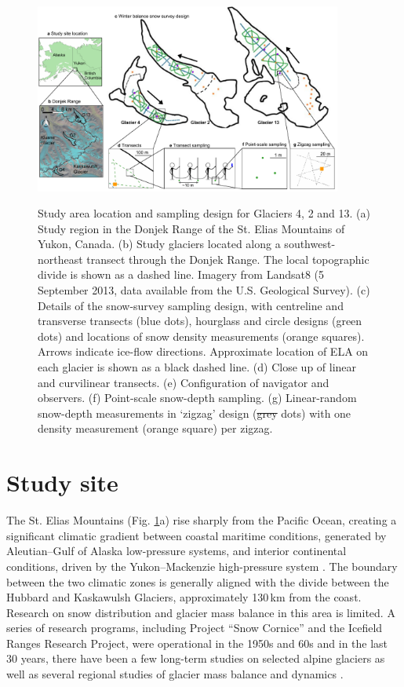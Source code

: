 \documentclass[review,oneside, letterpaper]{igs} %
\providecommand{\DIFadd}[1]{{\protect\color{blue}\uwave{#1}}} %
\providecommand{\DIFdel}[1]{{\protect\color{red}\sout{#1}}}                      %
\providecommand{\DIFaddFL}[1]{\DIFadd{#1}} %
\providecommand{\DIFdelFL}[1]{\DIFdel{#1}} %
\providecommand{\DIFaddbeginFL}{} %
\providecommand{\DIFaddendFL}{} %
\providecommand{\DIFdelbeginFL}{} %
\providecommand{\DIFdelendFL}{} %
\newcommand{\DIFscaledelfig}{0.5}
\newlength{\DIFdelgraphicswidth} %
\newlength{\DIFdelgraphicsheight} %
\newcommand{\DIFaddincludegraphics}[2][]{{\color{blue}\fbox{\DIFOincludegraphics[#1]{#2}}}} %
\newcommand{\DIFdelincludegraphics}[2][]{%
\sbox{\DIFdelgraphicsbox}{\DIFOincludegraphics[#1]{#2}}%
\settoboxwidth{\DIFdelgraphicswidth}{\DIFdelgraphicsbox} %
\settoboxtotalheight{\DIFdelgraphicsheight}{\DIFdelgraphicsbox} %
\scalebox{\DIFscaledelfig}{%
\parbox[b]{\DIFdelgraphicswidth}{\usebox{\DIFdelgraphicsbox}\\[-\baselineskip] \rule{\DIFdelgraphicswidth}{0em}}\llap{\resizebox{\DIFdelgraphicswidth}{\DIFdelgraphicsheight}{%
\setlength{\unitlength}{\DIFdelgraphicswidth}%
\begin{picture}(1,1)%
\thicklines\linethickness{2pt} %
{\color[rgb]{1,0,0}\put(0,0){\framebox(1,1){}}}%
{\color[rgb]{1,0,0}\put(0,0){\line( 1,1){1}}}%
{\color[rgb]{1,0,0}\put(0,1){\line(1,-1){1}}}%
\end{picture}%
}\hspace*{3pt}}} %
} %
\DeclareRobustCommand{\DIFaddbeginFL}{\DIFOaddbeginFL \let\includegraphics\DIFaddincludegraphics} %
\DeclareRobustCommand{\DIFaddendFL}{\DIFOaddendFL \let\includegraphics\DIFOincludegraphics} %
\DeclareRobustCommand{\DIFdelbeginFL}{\DIFOdelbeginFL \let\includegraphics\DIFdelincludegraphics} %
\DeclareRobustCommand{\DIFdelendFL}{\DIFOaddendFL \let\includegraphics\DIFOincludegraphics} %
\begin{document}
\begin{figure}
	\centering
	\includegraphics[width =0.9\textwidth]{Sampling.pdf}\\
	\caption{Study area location and sampling design for Glaciers 4, 2 and 13. (a) Study region in the Donjek Range of the St. Elias Mountains of Yukon, Canada. (b) Study glaciers located along a southwest-northeast transect through the Donjek Range. The local topographic divide is shown as a dashed line. Imagery from Landsat8 (5 September 2013, data available from the U.S. Geological Survey). (c) Details of the snow-survey sampling design, with centreline and transverse transects (blue dots), hourglass and circle designs (green dots) and locations of snow density measurements (orange squares). Arrows indicate ice-flow directions. Approximate location of ELA on each glacier is shown as a black dashed line. (d) Close up of linear and curvilinear transects. (e) Configuration of navigator and observers. (f) Point-scale snow-depth sampling. (g) Linear-random snow-depth measurements in `zigzag' design (\DIFdelbeginFL \DIFdelFL{grey }\DIFdelendFL \DIFaddbeginFL \DIFaddFL{purple }\DIFaddendFL dots) with one density measurement (orange square) per zigzag.}
	\label{fig:Sampling}
\end{figure}

\section{Study site}

The St. Elias Mountains (Fig. \ref{fig:Sampling}a) rise sharply from the Pacific Ocean, creating a significant climatic gradient between coastal maritime conditions, generated by Aleutian--Gulf of Alaska low-pressure systems, and interior continental conditions, driven by the Yukon--Mackenzie high-pressure system \citep{Taylor1969}. The boundary between the two climatic zones is generally aligned with the divide between the Hubbard and Kaskawulsh Glaciers, approximately 130\,km from the coast. Research on snow distribution and glacier mass balance in this area is limited. A series of research programs, including Project ``Snow Cornice''  and the Icefield Ranges Research Project, were operational in the 1950s and 60s \citep{Wood1948, Danby2003} and in the last 30 years, there have been a few long-term studies on selected alpine glaciers \citep[e.g.][]{Clarke2014} as well as several regional studies of glacier mass balance and dynamics \citep[e.g.][]{Arendt2008, Burgess2013,Waechter2015}.
\end{document}
